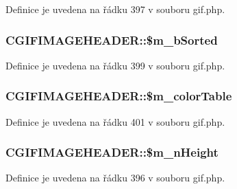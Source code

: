 Definice je uvedena na řádku 397 v souboru gif.\-php.

\hypertarget{class_c_g_i_f_i_m_a_g_e_h_e_a_d_e_r_a16ada1244f85b4a1eba2fa95a0108022}{
\subsubsection[{\$m\-\_\-b\-Sorted}]{\setlength{\rightskip}{0pt plus 5cm}C\-G\-I\-F\-I\-M\-A\-G\-E\-H\-E\-A\-D\-E\-R\-::\$m\-\_\-b\-Sorted}}\label{class_c_g_i_f_i_m_a_g_e_h_e_a_d_e_r_a16ada1244f85b4a1eba2fa95a0108022}


Definice je uvedena na řádku 399 v souboru gif.\-php.

\hypertarget{class_c_g_i_f_i_m_a_g_e_h_e_a_d_e_r_a4257d045d29c62aae5c985e212ab0d70}{
\subsubsection[{\$m\-\_\-color\-Table}]{\setlength{\rightskip}{0pt plus 5cm}C\-G\-I\-F\-I\-M\-A\-G\-E\-H\-E\-A\-D\-E\-R\-::\$m\-\_\-color\-Table}}\label{class_c_g_i_f_i_m_a_g_e_h_e_a_d_e_r_a4257d045d29c62aae5c985e212ab0d70}


Definice je uvedena na řádku 401 v souboru gif.\-php.

\hypertarget{class_c_g_i_f_i_m_a_g_e_h_e_a_d_e_r_a9556503639b3b401e04d7779593326ea}{
\subsubsection[{\$m\-\_\-n\-Height}]{\setlength{\rightskip}{0pt plus 5cm}C\-G\-I\-F\-I\-M\-A\-G\-E\-H\-E\-A\-D\-E\-R\-::\$m\-\_\-n\-Height}}\label{class_c_g_i_f_i_m_a_g_e_h_e_a_d_e_r_a9556503639b3b401e04d7779593326ea}


Definice je uvedena na řádku 396 v souboru gif.\-php.

